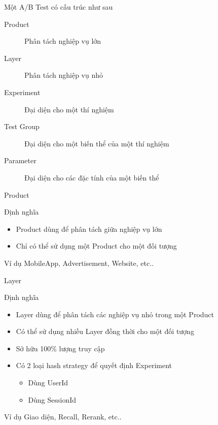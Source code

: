 \begin{frame}{Một A/B Test có cấu trúc như sau}
	\begin{description}
		\item[Product] Phân tách nghiệp vụ lớn
		\item[Layer] Phân tách nghiệp vụ nhỏ
		\item[Experiment] Đại diện cho một thí nghiệm
		\item[Test Group] Đại diện cho một biến thể của một thí nghiệm
		\item[Parameter] Đại diện cho các đặc tính của một biến thể
	\end{description}
\end{frame}

\begin{frame}{Product}
	\begin{block}{Định nghĩa}
		\begin{itemize}
			\item Product dùng để phân tách giữa nghiệp vụ lớn
			\item Chỉ có thể sử dụng một Product cho một đối tượng
		\end{itemize}
	\end{block}
	\begin{block}{Ví dụ}
		MobileApp, Advertisement, Website, etc..
	\end{block}
\end{frame}

\begin{frame}{Layer}
	\begin{block}{Định nghĩa}
		\begin{itemize}
			\item Layer dùng để phân tách các nghiệp vụ nhỏ trong một Product
			\item Có thể sử dụng nhiều Layer đồng thời cho một đối tượng
			\item Sở hữu 100\% lượng truy cập
			\item Có 2 loại hash strategy để quyết định Experiment
			      \begin{itemize}
				      \item Dùng UserId
				      \item Dùng SessionId
			      \end{itemize}
		\end{itemize}
	\end{block}
	\begin{block}{Ví dụ}
		Giao diện, Recall, Rerank, etc..
	\end{block}
\end{frame}

